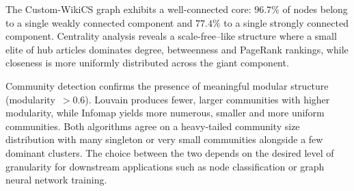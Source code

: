 \documentclass[12pt,a4paper]{article}
\begin{document}
The Custom-WikiCS graph exhibits a well-connected core: $96.7\%$ of nodes
belong to a single weakly connected component and $77.4\%$ to a single
strongly connected component.  Centrality analysis reveals a scale-free--like
structure where a small elite of hub articles dominates degree, betweenness
and PageRank rankings, while closeness is more uniformly distributed across
the giant component.

Community detection confirms the presence of meaningful modular structure
(modularity~$> 0.6$).  Louvain produces fewer, larger communities with higher
modularity, while Infomap yields more numerous, smaller and more uniform
communities.  Both algorithms agree on a heavy-tailed community size
distribution with many singleton or very small communities alongside a few
dominant clusters.  The choice between the two depends on the desired level
of granularity for downstream applications such as node classification or
graph neural network training.
\end{document}
